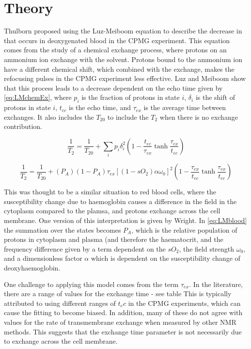 \section{Theory}
Thulborn proposed using the Luz-Meiboom equation to describe the decrease in \Ttwo that occurs in deoxygenated blood in the CPMG experiment.
This equation comes from the study of a chemical exchange process, where protons on an ammonium ion exchange with the solvent\cite{LuzNuclearMagneticResonance1963}.
Protons bound to the ammonium ion have a different chemical shift, which combined with the exchange, makes the refocusing pulses in the CPMG experiment less effective.
Luz and Meiboom show that this process leads to a \Ttwo decrease dependent on the echo time given by \autoref{eq:LMchemEx}\cite{LuzNuclearMagneticResonance1963}, where $p_i$ is the fraction of protons in state $i$, $\delta_i$ is the shift of protons in state $i$, $t_{ec}$ is the echo time, and $\tau_{ex}$ is the average time between exchanges. It also includes the $T_{20}$ to include the $T_2$ when there is no exchange contribution.

\begin{equation}
\label{eq:LMchemEx}
\frac{1}{T_2} = \frac{1}{T_{20}} + \sum_i{p_i\delta_i^2} (1 - \frac{t_{ec}}{\tau_{ex}} \tanh{\frac{\tau_{ex}}{t_{ec}}})
\end{equation}

\begin{equation}
\label{eq:LMblood}
\frac{1}{T_2} = \frac{1}{T_{20}} +(P_A)(1 - P_A)\tau_{ex} [(1-sO_2)\alpha\omega_0]^2 (1 - \frac{\tau_{ex}}{t_{ec}} \tanh{\frac{\tau_{ex}}{t_{ec}}})
\end{equation}

This was thought to be a similar situation to red blood cells, where the susceptibility change due to haemoglobin causes a difference in the field in the cytoplasm compared to the plamsa, and protons exchange across the cell membrane.
One version of this interpretation is given by Wright\cite{WrightEstimatingoxygensaturation1991}. In \autoref{eq:LMblood} the summation over the states becomes $P_A$, which is the relative population of protons in cytoplasm and plasma (and therefore the haematocrit, and the frequency difference given by a term dependent on the $sO_2$, the field strength $\omega_0$, and a dimensionless factor $\alpha$ which is dependent on the susceptibility change of deoxyhaemoglobin.

One challenge to applying this model comes from the term $\tau_{ex}$.
In the literature, there are a range of values for the exchange time - see table %
This is typically attributed to using different ranges of $t_ec$ in the CPMG experiments, which can cause the fitting to become biased.
In addition, many of these do not agree with values for the rate of transmembrane exchange when measured by other NMR methods.
This suggests that the exchange time parameter is not necessarily due to exchange across the cell membrane.

